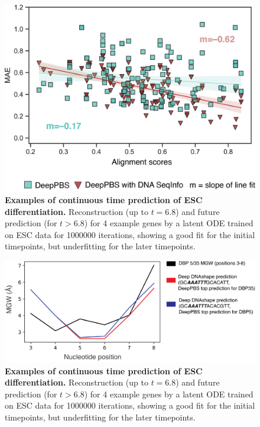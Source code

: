 \begin{center}
\begin{figure}[H]
  \includegraphics[width=\linewidth]{./pdnafigs/figS11.png}
    \caption[Examples of continuous time prediction of ESC differentiation.]{\textbf{Examples of continuous time prediction of ESC differentiation.} Reconstruction (up to $t=6.8$) and future prediction (for $t>6.8$) for 4 example genes by a  latent ODE \citep{chen2018neural} trained on ESC data \citep{Klein2015} for 1000000 iterations, showing a good fit for the initial timepoints, but underfitting for the later timepoints.}
  \label{fig:pdnaS11}
\end{figure}
\end{center}

\begin{center}
\begin{figure}[H]
  \includegraphics[width=\linewidth]{./pdnafigs/figS12.png}
    \caption[Examples of continuous time prediction of ESC differentiation.]{\textbf{Examples of continuous time prediction of ESC differentiation.} Reconstruction (up to $t=6.8$) and future prediction (for $t>6.8$) for 4 example genes by a  latent ODE \citep{chen2018neural} trained on ESC data \citep{Klein2015} for 1000000 iterations, showing a good fit for the initial timepoints, but underfitting for the later timepoints.}
  \label{fig:pdnaS12}
\end{figure}
\end{center}
